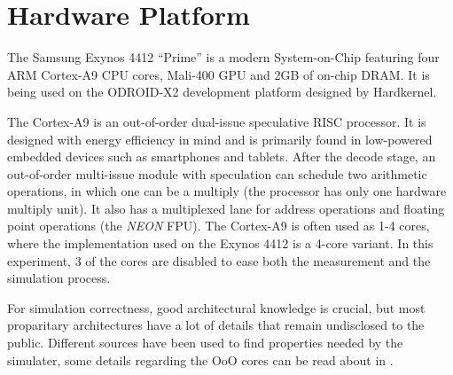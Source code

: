 \section{Hardware Platform}

The Samsung Exynos 4412 ``Prime'' is a modern System-on-Chip featuring four ARM
Cortex-A9 CPU cores, Mali-400 GPU and 2GB of on-chip DRAM. It is being used on
the ODROID-X2 development platform designed by Hardkernel\cite{hardkernel}.

The Cortex-A9 is an out-of-order dual-issue speculative RISC processor. It is
designed with energy efficiency in mind and is primarily found in low-powered
embedded devices such as smartphones and tablets. After the decode stage, an
out-of-order multi-issue module with speculation can schedule two arithmetic
operations, in which one can be a multiply (the processor has only one hardware
multiply unit). It also has a multiplexed lane for address operations and
floating point operations (the \emph{NEON} FPU). The Cortex-A9 is often used as 1-4 cores\cite{armsite},
where the implementation used on the Exynos 4412 is a 4-core variant\cite{somesite}. In this
experiment, 3 of the cores are disabled to ease both the measurement and the
simulation process.

For simulation correctness, good architectural knowledge is crucial, but most
proparitary architectures have a lot of details that remain undisclosed to the
public. Different sources have been used to find properties needed by the simulater,
some details regarding the OoO cores can be read about in \cite{blem2013detailed}.
